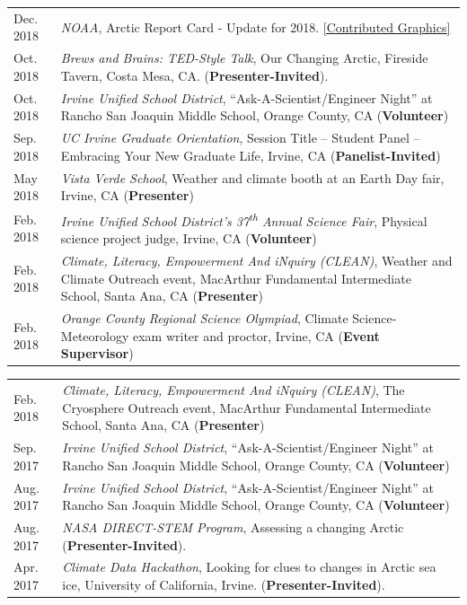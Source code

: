 \documentclass[margin,line,palatino,courier,10pt]{res}
\begin{document}
\begin{resume}
\begin{tabular}{@{}p{0.9in}p{4in}}
Dec. 2018 & \textit{NOAA}, Arctic Report Card - Update for 2018. \href{https://www.youtube.com/watch?v=XntO9a-NpeM}{[Contributed Graphics]}\\
Oct. 2018 & \textit{Brews and Brains: TED-Style Talk}, Our Changing Arctic, Fireside Tavern, Costa Mesa, CA. (\textbf{Presenter-Invited}).\\
Oct. 2018 & \textit{Irvine Unified School District}, ``Ask-A-Scientist/Engineer Night'' at Rancho San Joaquin Middle School, Orange County, CA (\textbf{Volunteer})\\
Sep. 2018 & \textit{UC Irvine Graduate Orientation}, Session Title -- Student Panel -- Embracing Your New Graduate Life, Irvine, CA (\textbf{Panelist-Invited})\\
May 2018 & \textit{Vista Verde School}, Weather and climate booth at an Earth Day fair, Irvine, CA (\textbf{Presenter})\\
Feb. 2018 & \textit{Irvine Unified School District's 37\textsuperscript{th} Annual Science Fair}, Physical science project judge, Irvine, CA (\textbf{Volunteer})\\
Feb. 2018 & \textit{Climate, Literacy, Empowerment And iNquiry (CLEAN)}, Weather and Climate Outreach event, MacArthur Fundamental Intermediate School, Santa Ana, CA (\textbf{Presenter})\\
Feb. 2018 & \textit{Orange County Regional Science Olympiad}, Climate Science-Meteorology exam writer and proctor, Irvine, CA (\textbf{Event Supervisor})\\
\end{tabular}
\begin{tabular}{@{}p{0.9in}p{4in}}
Feb. 2018 & \textit{Climate, Literacy, Empowerment And iNquiry (CLEAN)}, The Cryosphere Outreach event, MacArthur Fundamental Intermediate School, Santa Ana, CA (\textbf{Presenter})\\
Sep. 2017 & \textit{Irvine Unified School District}, ``Ask-A-Scientist/Engineer Night'' at Rancho San Joaquin Middle School, Orange County, CA (\textbf{Volunteer})\\
Aug. 2017 & \textit{Irvine Unified School District}, ``Ask-A-Scientist/Engineer Night'' at Rancho San Joaquin Middle School, Orange County, CA (\textbf{Volunteer})\\
Aug. 2017 & \textit{NASA DIRECT-STEM Program}, Assessing a changing Arctic (\textbf{Presenter-Invited}).\\
Apr. 2017 & \textit{Climate Data Hackathon}, Looking for clues to changes in Arctic 
sea ice, University of California, Irvine. (\textbf{Presenter-Invited}).\\

\end{tabular}
\end{resume}
\end{document}
